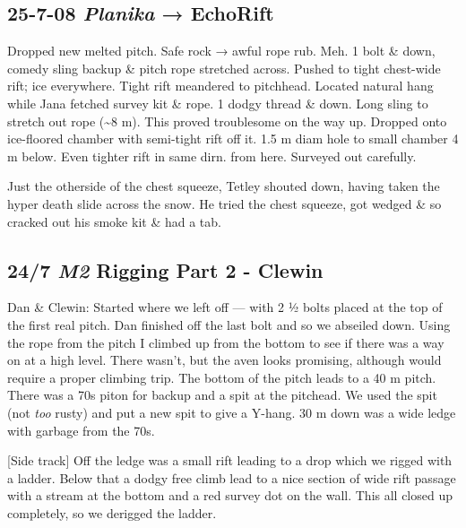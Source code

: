 
\hypertarget{planika-echorift}{%
\subsection{\texorpdfstring{25-7-08 \emph{Planika} →
EchoRift}{25-7-08 Planika → EchoRift}}\label{planika-echorift}}

Dropped new melted pitch. Safe rock → awful rope rub. Meh. 1 bolt \&
down, comedy sling backup \& pitch rope stretched across. Pushed to
tight chest-wide rift; ice everywhere. Tight rift meandered to
pitchhead. Located natural hang while Jana fetched survey kit \& rope. 1
dodgy thread \& down. Long sling to stretch out rope (\textasciitilde8
m). This proved troublesome on the way up. Dropped onto ice-floored
chamber with semi-tight rift off it. 1.5 m diam hole to small chamber 4
m below. Even tighter rift in same dirn. from here. Surveyed out
carefully.

Just the otherside of the chest squeeze, Tetley shouted down, having
taken the hyper death slide across the snow. He tried the chest squeeze,
got wedged \& so cracked out his smoke kit \& had a tab.

\hypertarget{m2-rigging-part-2---clewin}{%
\subsection{\texorpdfstring{24/7 \emph{M2} Rigging Part 2 -
Clewin}{24/7 M2 Rigging Part 2 - Clewin}}\label{m2-rigging-part-2---clewin}}

Dan \& Clewin: Started where we left off --- with 2 ½ bolts placed at
the top of the first real pitch. Dan finished off the last bolt and so
we abseiled down. Using the rope from the pitch I climbed up from the
bottom to see if there was a way on at a high level. There wasn't, but
the aven looks promising, although would require a proper climbing trip.
The bottom of the pitch leads to a 40 m pitch. There was a 70s piton for
backup and a spit at the pitchead. We used the spit (not \emph{too}
rusty) and put a new spit to give a Y-hang. 30 m down was a wide ledge
with garbage from the 70s.

{[}Side track{]} Off the ledge was a small rift leading to a drop which
we rigged with a ladder. Below that a dodgy free climb lead to a nice
section of wide rift passage with a stream at the bottom and a red
survey dot on the wall. This all closed up completely, so we derigged
the ladder.

